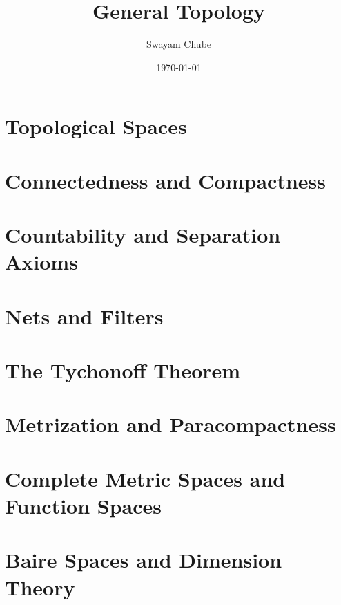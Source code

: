 \documentclass[oneside]{report}
\title{General Topology}
\author{Swayam Chube}
\date{\today}
\begin{document}
    \maketitle
    \tableofcontents
    \chapter{Topological Spaces}
    

	\chapter{Connectedness and Compactness}
	

	\chapter{Countability and Separation Axioms}
	

	\chapter{Nets and Filters}
	

	\chapter{The Tychonoff Theorem}
	

	\chapter{Metrization and Paracompactness}
	

	\chapter{Complete Metric Spaces and Function Spaces}
	

	\chapter{Baire Spaces and Dimension Theory}
	
\end{document}
